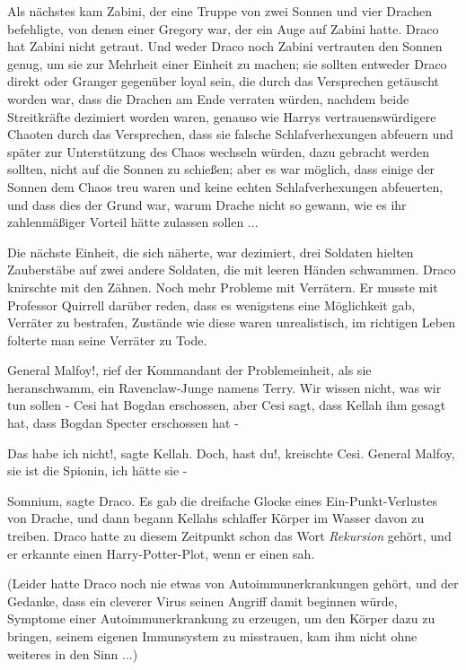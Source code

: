 Als nächstes kam Zabini, der eine Truppe von zwei Sonnen und vier Drachen
befehligte, von denen einer Gregory war, der ein Auge auf Zabini hatte. Draco
hat Zabini nicht getraut. Und weder Draco noch Zabini vertrauten den Sonnen
genug, um sie zur Mehrheit einer Einheit zu machen; sie sollten entweder Draco
direkt oder Granger gegenüber loyal sein, die durch das Versprechen getäuscht
worden war, dass die Drachen am Ende verraten würden, nachdem beide Streitkräfte
dezimiert worden waren, genauso wie Harrys vertrauenswürdigere Chaoten durch das
Versprechen, dass sie falsche Schlafverhexungen abfeuern und später zur
Unterstützung des Chaos wechseln würden, dazu gebracht werden sollten, nicht auf
die Sonnen zu schießen; aber es war möglich, dass einige der Sonnen dem Chaos
treu waren und keine echten Schlafverhexungen abfeuerten, und dass dies der
Grund war, warum Drache nicht so gewann, wie es ihr zahlenmäßiger Vorteil hätte
zulassen sollen ...

Die nächste Einheit, die sich näherte, war dezimiert, drei Soldaten hielten
Zauberstäbe auf zwei andere Soldaten, die mit leeren Händen schwammen. Draco
knirschte mit den Zähnen. Noch mehr Probleme mit Verrätern. Er musste mit
Professor Quirrell darüber reden, dass es wenigstens eine Möglichkeit gab,
Verräter zu bestrafen, Zustände wie diese waren unrealistisch, im richtigen
Leben folterte man seine Verräter zu Tode.

\glqq{}General Malfoy!\grqq{}, rief der Kommandant der Problemeinheit, als sie
heranschwamm, ein Ravenclaw-Junge namens Terry. \glqq{}Wir wissen nicht, was wir
tun sollen - Cesi hat Bogdan erschossen, aber Cesi sagt, dass Kellah ihm gesagt
hat, dass Bogdan Specter erschossen hat -\grqq{}

\glqq{}Das habe ich nicht!\grqq{}, sagte Kellah. \glqq{}Doch, hast du!\grqq{},
kreischte Cesi. \glqq{}General Malfoy, sie ist die Spionin, ich hätte sie -\grqq{}

\glqq{}Somnium\grqq{}, sagte Draco. Es gab die dreifache Glocke eines
Ein-Punkt-Verlustes von Drache, und dann begann Kellahs schlaffer Körper im
Wasser davon zu treiben. Draco hatte zu diesem Zeitpunkt schon das Wort \glqq{}
\emph{Rekursion}\grqq{} gehört, und er erkannte einen Harry-Potter-Plot, wenn er
einen sah.

(Leider hatte Draco noch nie etwas von Autoimmunerkrankungen gehört, und der
Gedanke, dass ein cleverer Virus seinen Angriff damit beginnen würde, Symptome
einer Autoimmunerkrankung zu erzeugen, um den Körper dazu zu bringen, seinem
eigenen Immunsystem zu misstrauen, kam ihm nicht ohne weiteres in den Sinn ...)

